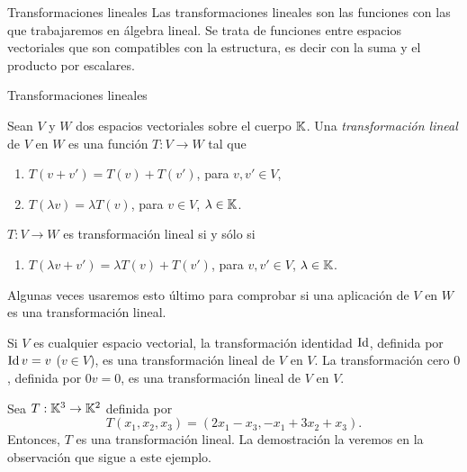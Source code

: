       
    \begin{chapter}{Transformaciones lineales}\label{chap-trans-lin}
        Las transformaciones lineales son las funciones con las que trabajaremos en álgebra lineal. Se trata de funciones entre espacios vectoriales que son compatibles con la estructura,  es decir con la suma y el producto por escalares.
        
        
        \begin{section}{Transformaciones lineales}\label{seccion-transformaciones-lineales}
            \begin{definicion}
                Sean $V$ y $W$ dos espacios vectoriales sobre el cuerpo $\mathbb K$. Una 				\textit{transformación lineal} de $V$ en $W$ es una función $T:V \to W$  tal que
                \begin{enumerate}
                    \item $T(v+v') = T(v)+ T(v')$, para $v,v' \in V$,
                    \item $T(\lambda v) = \lambda T(v)$, para $v \in V$, $\lambda \in \mathbb K$.
                \end{enumerate}
            \end{definicion}
        
            \begin{observacion*}
                $T:V \to W$ es transformación lineal si y sólo si
                \begin{enumerate}[label=\textit{\alph*)}, ref=\textit{\alph*)}]
                    \item $T(\lambda v+v') = \lambda T(v)+ T(v')$, para $v,v' \in V$, $\lambda \in \mathbb K$.
                \end{enumerate}
            Algunas veces usaremos esto último para comprobar si una aplicación de $V$ en $W$ es una transformación lineal. 
            \end{observacion*}
            
            \begin{ejemplo*}
                Si $V$ es cualquier espacio vectorial, la transformación identidad $\operatorname{Id}$, definida por $\operatorname{Id} v = v$ ($v \in V$), es una transformación lineal de $V$ en $V$. La transformación cero $0$, definida por $0v = 0$, es una transformación lineal de $V$ en $V$.
            \end{ejemplo*}
        
            \begin{ejemplo*}
                Sea $T : \mathbb K^3 \to \mathbb K^2$ definida por
                $$
                T(x_1,x_2,x_3) = (2x_1 - x_3, -x_1+3x_2+x_3).
                $$
                Entonces, $T$  es una transformación lineal. La demostración la veremos en la observación que sigue a este ejemplo. 
                

\end{ejemplo*}
\end{section}
\end{chapter}

